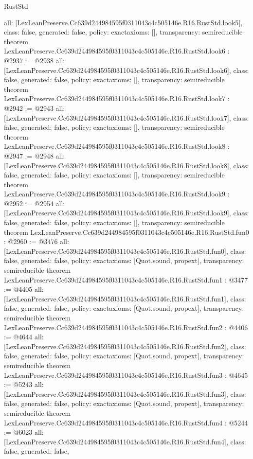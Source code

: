 \begin{lexlean}{RustStd}
\begin{coremodule}
{  all: [LexLeanPreserve.Cc639d244984595f0311043c4c505146e.R16.RustStd.look5],
  class: false,
  generated: false,
  policy: exact{axioms: []},
  transparency: semireducible
}
theorem LexLeanPreserve.Cc639d244984595f0311043c4c505146e.R16.RustStd.look6 : @2937 := @2938 {
  all: [LexLeanPreserve.Cc639d244984595f0311043c4c505146e.R16.RustStd.look6],
  class: false,
  generated: false,
  policy: exact{axioms: []},
  transparency: semireducible
}
theorem LexLeanPreserve.Cc639d244984595f0311043c4c505146e.R16.RustStd.look7 : @2942 := @2943 {
  all: [LexLeanPreserve.Cc639d244984595f0311043c4c505146e.R16.RustStd.look7],
  class: false,
  generated: false,
  policy: exact{axioms: []},
  transparency: semireducible
}
theorem LexLeanPreserve.Cc639d244984595f0311043c4c505146e.R16.RustStd.look8 : @2947 := @2948 {
  all: [LexLeanPreserve.Cc639d244984595f0311043c4c505146e.R16.RustStd.look8],
  class: false,
  generated: false,
  policy: exact{axioms: []},
  transparency: semireducible
}
theorem LexLeanPreserve.Cc639d244984595f0311043c4c505146e.R16.RustStd.look9 : @2952 := @2954 {
  all: [LexLeanPreserve.Cc639d244984595f0311043c4c505146e.R16.RustStd.look9],
  class: false,
  generated: false,
  policy: exact{axioms: []},
  transparency: semireducible
}
theorem LexLeanPreserve.Cc639d244984595f0311043c4c505146e.R16.RustStd.fun0 : @2960 := @3476 {
  all: [LexLeanPreserve.Cc639d244984595f0311043c4c505146e.R16.RustStd.fun0],
  class: false,
  generated: false,
  policy: exact{axioms: [Quot.sound, propext]},
  transparency: semireducible
}
theorem LexLeanPreserve.Cc639d244984595f0311043c4c505146e.R16.RustStd.fun1 : @3477 := @4405 {
  all: [LexLeanPreserve.Cc639d244984595f0311043c4c505146e.R16.RustStd.fun1],
  class: false,
  generated: false,
  policy: exact{axioms: [Quot.sound, propext]},
  transparency: semireducible
}
theorem LexLeanPreserve.Cc639d244984595f0311043c4c505146e.R16.RustStd.fun2 : @4406 := @4644 {
  all: [LexLeanPreserve.Cc639d244984595f0311043c4c505146e.R16.RustStd.fun2],
  class: false,
  generated: false,
  policy: exact{axioms: [Quot.sound, propext]},
  transparency: semireducible
}
theorem LexLeanPreserve.Cc639d244984595f0311043c4c505146e.R16.RustStd.fun3 : @4645 := @5243 {
  all: [LexLeanPreserve.Cc639d244984595f0311043c4c505146e.R16.RustStd.fun3],
  class: false,
  generated: false,
  policy: exact{axioms: [Quot.sound, propext]},
  transparency: semireducible
}
theorem LexLeanPreserve.Cc639d244984595f0311043c4c505146e.R16.RustStd.fun4 : @5244 := @6023 {
  all: [LexLeanPreserve.Cc639d244984595f0311043c4c505146e.R16.RustStd.fun4],
  class: false,
  generated: false,
}
\end{coremodule}
\end{lexlean}
